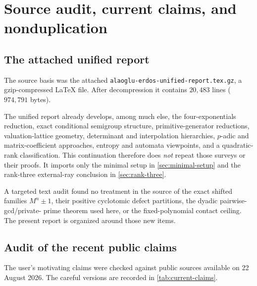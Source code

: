 \documentclass[11pt]{article}
\theoremstyle{definition}
\begin{document}
\section{Source audit, current claims, and nonduplication}

\subsection{The attached unified report}

The source basis was the attached
\nolinkurl{alaoglu-erdos-unified-report.tex.gz}, a gzip-compressed LaTeX file.  After
decompression it contains $20{,}483$ lines ($974{,}791$ bytes).

The unified report already develops, among much else, the four-exponentials reduction,
exact conditional semigroup structure, primitive-generator reductions, valuation-lattice
geometry, determinant and interpolation hierarchies, $p$-adic and matrix-coefficient
approaches, entropy and automata viewpoints, and a quadratic-rank classification.  This
continuation therefore does \emph{not} repeat those surveys or their proofs.  It imports
only the minimal setup in \cref{sec:minimal-setup} and the rank-three external-ray
conclusion in \cref{sec:rank-three}.

A targeted text audit found no treatment in the source of the exact shifted families
$M^n\pm1$, their positive cyclotomic defect partitions, the dyadic pairwise-gcd/private-
prime theorem used here, or the fixed-polynomial contact ceiling.  The present report is
organized around those new items.

\subsection{Audit of the recent public claims}

The user's motivating claims were checked against public sources available on
22 August 2026.  The careful versions are recorded in \cref{tab:current-claims}.
\end{document}
